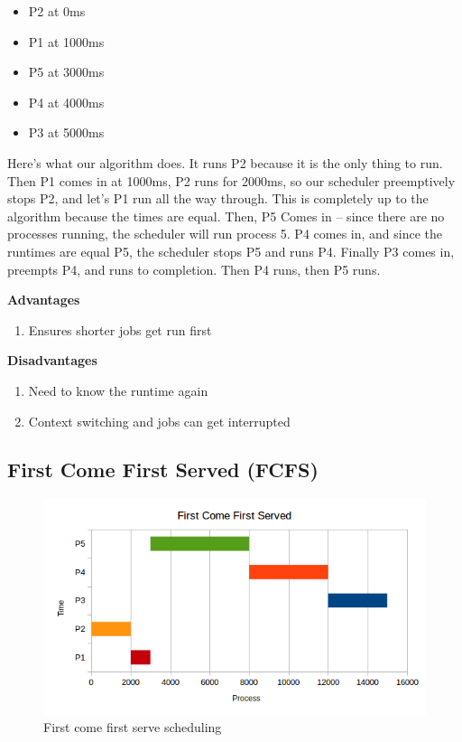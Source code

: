 \begin{itemize}
\tightlist
\item
  P2 at 0ms
\item
  P1 at 1000ms
\item
  P5 at 3000ms
\item
  P4 at 4000ms
\item
  P3 at 5000ms
\end{itemize}

Here's what our algorithm does.
It runs P2 because it is the only thing to run.
Then P1 comes in at 1000ms, P2 runs for 2000ms, so our scheduler preemptively stops P2, and let's P1 run all the way through.
This is completely up to the algorithm because the times are equal.
Then, P5 Comes in -- since there are no processes running, the scheduler will run process 5.
P4 comes in, and since the runtimes are equal P5, the scheduler stops P5 and runs P4.
Finally P3 comes in, preempts P4, and runs to completion.
Then P4 runs, then P5 runs.

\textbf{Advantages}

\begin{enumerate}
  \item Ensures shorter jobs get run first
\end{enumerate}

\textbf{Disadvantages}

\begin{enumerate}
  \item Need to know the runtime again
  \item Context switching and jobs can get interrupted
\end{enumerate}

\subsection{First Come First Served (FCFS)}

\begin{figure}[htbp]
\centering
\includegraphics[width=\textwidth]{scheduling/images/fcfs.png}
\caption{First come first serve scheduling}
\end{figure}


